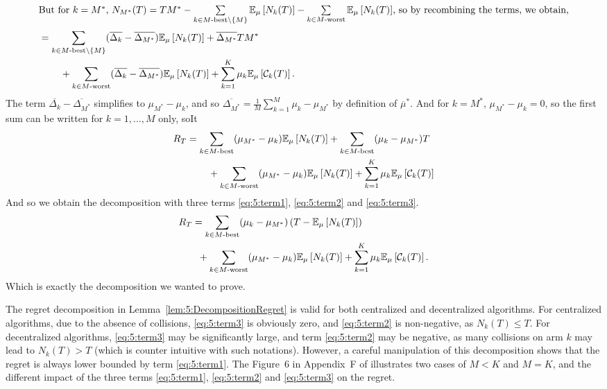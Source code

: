 \begin{smallproof}
\begin{align*}
    \intertext{But for $k = M^*$, $N_{M^*}(T) = T M^* - \sum\limits_{k \in M\text{-}\mathrm{best}\setminus\{M\}} \mathbb{E}_{\mu}\left[ N_k(T) \right] - \sum\limits_{k \in M\text{-}\mathrm{worst}} \mathbb{E}_{\mu}\left[ N_k(T) \right]$, so by recombining the terms, we obtain,}
    &= \sum_{k \in M\text{-}\mathrm{best}\setminus\{M\}} (\overline{\Delta_k} - \overline{\Delta_{M^*}}) \mathbb{E}_{\mu}\left[ N_k(T) \right]
      + \overline{\Delta_{M^*}} T M^* \\
      &\;\;\;\;\;\;\;\; + \sum_{k \in M\text{-}\mathrm{worst}} (\overline{\Delta_k} - \overline{\Delta_{M^*}}) \mathbb{E}_{\mu}\left[ N_k(T) \right]
      + \sum_{k=1}^{K} \mu_k \mathbb{E}_{\mu}\left[ \mathcal{C}_k(T) \right].
  \end{align*}
  The term $\overline{\Delta_k} - \overline{\Delta_{M^*}}$ simplifies to $\mu_{M^*} - \mu_k$, and so $\overline{\Delta_{M^*}} = \frac{1}{M} \sum_{k=1}^{M} \mu_k - \mu_{M^*}$ by definition of $\overline{\mu}^*$. And for $k=M^*$, $\mu_{M^*} - \mu_k = 0$, so the first sum can be written for $k = 1,\dots,M$ only, soIt
  \begin{align*}
    R_T
    &= \sum_{k \in M\text{-}\mathrm{best}} (\mu_{M^*} - \mu_k) \mathbb{E}_{\mu}\left[ N_k(T) \right]
      + \sum_{k \in M\text{-}\mathrm{best}} (\mu_k - \mu_{M^*}) T \\
      &\;\;\;\;\;\;\;\; + \sum_{k \in M\text{-}\mathrm{worst}} (\mu_{M^*} - \mu_k) \mathbb{E}_{\mu}\left[ N_k(T) \right]
      + \sum_{k=1}^{K} \mu_k \mathbb{E}_{\mu}\left[ \mathcal{C}_k(T) \right]
  \end{align*}
  And so we obtain the decomposition with three terms \ref{eq:5:term1}, \ref{eq:5:term2} and \ref{eq:5:term3}.
  \begin{align*}
  R_T
    & = \sum_{k \in M\text{-}\mathrm{best}} (\mu_k - \mu_{M^*}) \left(T - \mathbb{E}_{\mu}\left[ N_k(T) \right]\right) \\
      & \;\; + \sum_{k \in M\text{-}\mathrm{worst}} (\mu_{M^*} - \mu_k) \mathbb{E}_{\mu}\left[ N_k(T) \right]
      + \sum_{k=1}^{K} \mu_k \mathbb{E}_{\mu}\left[ \mathcal{C}_k(T) \right].
  \end{align*}
  Which is exactly the decomposition we wanted to prove.
\end{smallproof}


The regret decomposition in Lemma~\ref{lem:5:DecompositionRegret} is valid for both centralized and decentralized algorithms.
For centralized algorithms, due to the absence of collisions, \ref{eq:5:term3} is obviously zero, and \ref{eq:5:term2} is non-negative, as $N_k(T) \leq T$. For decentralized algorithms, \ref{eq:5:term3} may be significantly large, and term \ref{eq:5:term2} may be negative, as many collisions on arm $k$ may lead to $N_k(T) > T$ (which is counter intuitive with such notations).
However, a careful manipulation of this decomposition shows that the regret is always lower bounded by term \ref{eq:5:term1}.
The Figure~6 in Appendix~F of \cite{Besson2018ALT} illustrates two cases of $M<K$ and $M=K$, and the different impact of the three terms \ref{eq:5:term1}, \ref{eq:5:term2} and \ref{eq:5:term3} on the regret.

